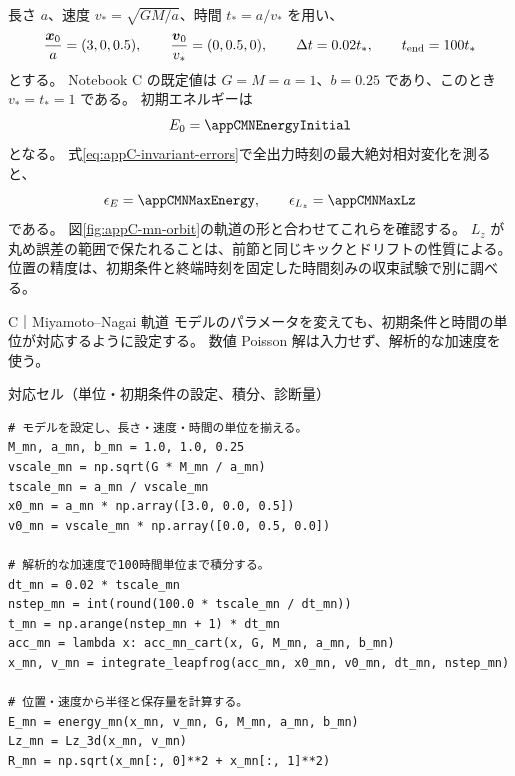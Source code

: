 長さ $a$、速度 $v_*=\sqrt{GM/a}$、時間 $t_*=a/v_*$ を用い、
\begin{equation}
 \frac{\boldsymbol x_0}{a}=(3,0,0.5),\qquad
 \frac{\boldsymbol v_0}{v_*}=(0,0.5,0),\qquad
 \Delta t=0.02t_*,\qquad t_{\rm end}=100t_*
\end{equation}
とする。
Notebook C の既定値は $G=M=a=1$、$b=0.25$ であり、このとき $v_*=t_*=1$ である。
初期エネルギーは
\begin{equation}
 E_0=\appCMNEnergyInitial
\end{equation}
となる。
式\eqref{eq:appC-invariant-errors}で全出力時刻の最大絶対相対変化を測ると、
\begin{equation}
 \epsilon_E=\appCMNMaxEnergy,\qquad
 \epsilon_{L_z}=\appCMNMaxLz
\end{equation}
である。
図\ref{fig:appC-mn-orbit}の軌道の形と合わせてこれらを確認する。
$L_z$ が丸め誤差の範囲で保たれることは、前節と同じキックとドリフトの性質による。
位置の精度は、初期条件と終端時刻を固定した時間刻みの収束試験で別に調べる。

\begin{notebookblock}{C｜Miyamoto--Nagai 軌道}
モデルのパラメータを変えても、初期条件と時間の単位が対応するように設定する。
数値 Poisson 解は入力せず、解析的な加速度を使う。
\par\smallskip\noindent\begin{minipage}{\linewidth}
{\sffamily\small\color{graytext}対応セル（単位・初期条件の設定、積分、診断量）}
\begin{Verbatim}[fontsize=\footnotesize,xleftmargin=2mm,frame=single,framesep=1.8mm,framerule=0.35pt,rulecolor=\color{listingframe},fillcolor=\color{listingbg}]
# モデルを設定し、長さ・速度・時間の単位を揃える。
M_mn, a_mn, b_mn = 1.0, 1.0, 0.25
vscale_mn = np.sqrt(G * M_mn / a_mn)
tscale_mn = a_mn / vscale_mn
x0_mn = a_mn * np.array([3.0, 0.0, 0.5])
v0_mn = vscale_mn * np.array([0.0, 0.5, 0.0])

# 解析的な加速度で100時間単位まで積分する。
dt_mn = 0.02 * tscale_mn
nstep_mn = int(round(100.0 * tscale_mn / dt_mn))
t_mn = np.arange(nstep_mn + 1) * dt_mn
acc_mn = lambda x: acc_mn_cart(x, G, M_mn, a_mn, b_mn)
x_mn, v_mn = integrate_leapfrog(acc_mn, x0_mn, v0_mn, dt_mn, nstep_mn)

# 位置・速度から半径と保存量を計算する。
E_mn = energy_mn(x_mn, v_mn, G, M_mn, a_mn, b_mn)
Lz_mn = Lz_3d(x_mn, v_mn)
R_mn = np.sqrt(x_mn[:, 0]**2 + x_mn[:, 1]**2)
\end{Verbatim}
\end{minipage}

\end{notebookblock}

